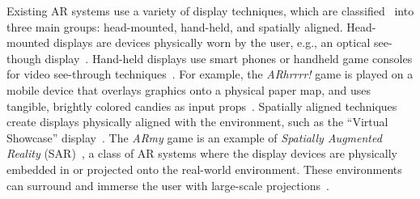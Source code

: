 \documentclass[10pt,twocolumn,letterpaper]{article}
\begin{document}
%
Existing AR systems use a variety of display techniques,
which are classified~\cite{BimberBook} into three main groups:
head-mounted, hand-held, and spatially aligned.
%
Head-mounted displays
are devices physically worn by the user, e.g.,
an optical see-though display~\cite{Sutherland1968}.  Hand-held
displays use 
smart phones or handheld game consoles
for video see-through
techniques~\cite{Pasman2003, Wagner2003, Nintendo3DS}.  
For example, the \emph{ARhrrrr!}
game
is played on a mobile device that overlays graphics onto a physical
paper map, and uses tangible, brightly colored
candies as input props~\cite{ARhrrrr!}.
%
Spatially aligned techniques create displays physically aligned with the environment,
such as the ``Virtual Showcase'' display~\cite{Bimber2005}.
%
%
The {\em ARmy} game is an example of \emph{Spatially Augmented
  Reality} (SAR)~\cite{BimberBook},
a class of AR systems where the display devices are physically 
embedded in or projected onto the real-world environment.
These environments can surround and immerse the user with large-scale
projections~\cite{Cruz-Neira1993,Raskar1998a}. 
\end{document}
